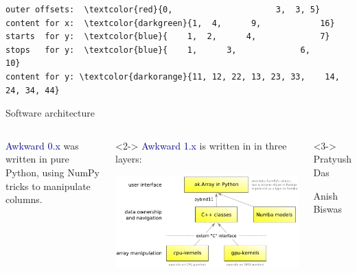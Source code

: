\documentclass[aspectratio=169]{beamer}
\begin{document}
\begin{frame}[fragile]{}
\begin{onlyenv}
\vspace{0.25 cm}
\begin{Verbatim}[commandchars=\\\{\}]
outer offsets:  \textcolor{red}{0,                     3,  3, 5}
content for x:  \textcolor{darkgreen}{1,  4,      9,            16}
starts  for y:  \textcolor{blue}{    1,  2,      4,             7}
stops   for y:  \textcolor{blue}{    1,      3,             6,            10}
content for y: \textcolor{darkorange}{11, 12, 22, 13, 23, 33,    14, 24, 34, 44}
\end{Verbatim}
\vspace{5 cm}
\end{onlyenv}
\end{frame}

\begin{frame}{Software architecture}
\large
\vspace{0.5 cm}
\begin{columns}
\textcolor{darkblue}{Awkward 0.x} was written in pure Python, using NumPy tricks to manipulate columns.

\vspace{0.5 cm}
\begin{uncoverenv}<2->
\textcolor{darkblue}{Awkward 1.x} is written in in three layers:

\begin{center}
\includegraphics[width=0.7\linewidth]{img/awkward-1-0-layers.pdf}
\end{center}
\end{uncoverenv}

\vspace{-1.63 cm}
\hfill \begin{minipage}{0.2\linewidth}
\begin{uncoverenv}<3->
Pratyush Das

Anish Biswas
\end{uncoverenv}
\end{minipage}
\vspace{1.63 cm}
\end{columns}
\end{frame}
\end{document}
